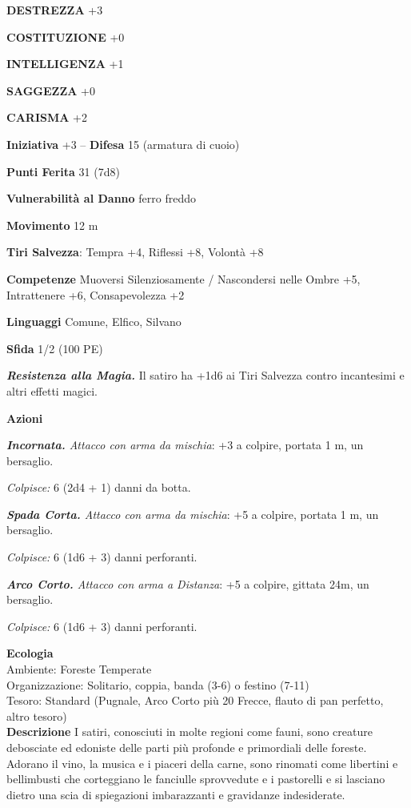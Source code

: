 \begin{multicols}{2}
\textbf{DESTREZZA} +3

\textbf{COSTITUZIONE} +0

\textbf{INTELLIGENZA} +1

\textbf{SAGGEZZA} +0

\textbf{CARISMA} +2

\textbf{Iniziativa} +3 -- \textbf{Difesa} 15 (armatura di cuoio)

\textbf{Punti Ferita} 31 (7d8)

\textbf{Vulnerabilità al Danno} ferro freddo

\textbf{Movimento} 12 m

\textbf{Tiri Salvezza}: Tempra +4, Riflessi +8, Volontà +8

\textbf{Competenze} Muoversi Silenziosamente / Nascondersi nelle Ombre +5, Intrattenere +6, Consapevolezza +2

\textbf{Linguaggi} Comune, Elfico, Silvano

\textbf{Sfida} 1/2 (100 PE)

\emph{\textbf{Resistenza alla Magia.}} Il satiro ha +1d6 ai Tiri Salvezza contro incantesimi e altri effetti magici.

\textbf{Azioni}

\emph{\textbf{Incornata.} Attacco con arma da mischia}: +3 a colpire, portata 1 m, un bersaglio.

\emph{Colpisce:} 6 (2d4 + 1) danni da botta.

\emph{\textbf{Spada Corta.} Attacco con arma da mischia}: +5 a colpire, portata 1 m, un bersaglio.

\emph{Colpisce:} 6 (1d6 + 3) danni perforanti.

\emph{\textbf{Arco Corto.} Attacco con arma a Distanza}: +5 a colpire, gittata 24m, un bersaglio.

\emph{Colpisce:} 6 (1d6 + 3) danni perforanti.

\textbf{Ecologia}\\
Ambiente: Foreste Temperate\\
Organizzazione: Solitario, coppia, banda (3-6) o festino (7-11)\\
Tesoro: Standard (Pugnale, Arco Corto più 20 Frecce, flauto di pan perfetto, altro tesoro)\\
\textbf{Descrizione}
I satiri, conosciuti in molte regioni come fauni, sono creature debosciate ed edoniste delle parti più profonde e primordiali delle foreste. Adorano il vino, la musica e i piaceri della carne, sono rinomati come libertini e bellimbusti che corteggiano le fanciulle sprovvedute e i pastorelli e si lasciano dietro una scia di spiegazioni imbarazzanti e gravidanze indesiderate.\\


\end{multicols}
